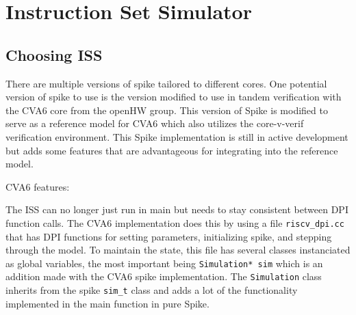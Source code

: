 \chapter{Instruction Set Simulator}


\section{Choosing ISS}



There are multiple versions of spike tailored to different cores. One potential version of spike to use is the version modified to use in tandem verification with the CVA6 core from the openHW group. This version of Spike is modified to serve as a reference model for CVA6 which also utilizes the core-v-verif verification environment. This Spike implementation is still in active development but adds some features that are advantageous for integrating into the reference model.

CVA6 features:

The ISS can no longer just run in main but needs to stay consistent between DPI function calls. The CVA6 implementation does this by using a file \lstinline{riscv_dpi.cc} that has DPI functions for setting parameters, initializing spike, and stepping through the model. To maintain the state, this file has several classes instanciated as global variables, the most important being \lstinline{Simulation* sim} which is an addition made with the CVA6 spike implementation. The \lstinline{Simulation} class inherits from the spike \lstinline{sim_t} class and adds a lot of the functionality implemented in the main function in pure Spike.  



